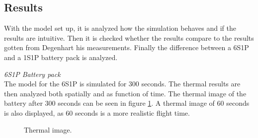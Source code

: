 \subsection{Results}
With the model set up, it is analyzed how the simulation behaves and if the results are intuitive. Then it is checked whether the results compare to the results gotten from Degenhart his measurements. Finally the difference between a 6S1P and a 1S1P battery pack is analyzed.

\textit{6S1P Battery pack}\\
The model for the 6S1P is simulated for 300 seconds. The thermal results are then analyzed both spatially and as function of time. The thermal image of the battery after 300 seconds can be seen in figure \ref{Fig:thermal_image}. A thermal image of 60 seconds is also displayed, as 60 seconds is a more realistic flight time.

\begin{figure}[H]
  \centering
  \hfill
  \caption{Thermal image.}
  \label{Fig:thermal_image}
\end{figure}

